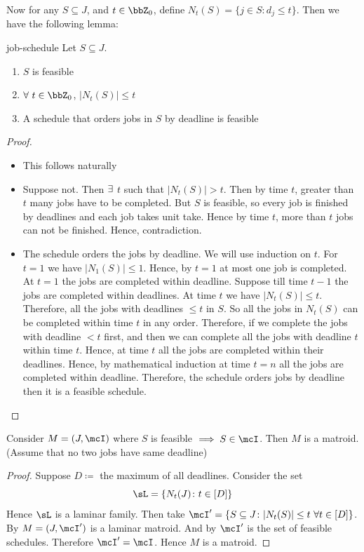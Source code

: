 Now  for any $S\subseteq J$, and $t\in\bbZ_0$, define $N_t(S)=\{j\in S\colon d_j\leq t\}$. Then we have the following lemma:
\begin{lemma}{}{job-schedule}
	Let $S\subseteq J$. \Tfae
	\begin{enumerate}[label=\bfseries\tiny\protect\circled{\small\arabic*}]
		\item $S$ is feasible
		\item $\forall\ t\in\bbZ_0$, $|N_t(S)|\leq t$
		\item A schedule that orders jobs in $S$ by deadline is feasible
	\end{enumerate}
\end{lemma}
\begin{proof}

\begin{itemize}[wide]
	\item[$3\implies 1$:] This follows naturally
	\item[$1\implies 2$:] Suppose not. Then $\exists$ $t$ such that $|N_t(S)|>t$. Then by time $t$, greater than $t$ many jobs have to be completed. But  $S$ is feasible, so every job is finished by deadlines and each job takes unit take. Hence by time $t$, more than $t$ jobs can not be finished. Hence, contradiction.
	\item[$2\implies 3$:] The schedule orders the jobs by deadline. We will use induction on $t$. For $t=1$ we have $|N_1(S)|\leq 1$. Hence, by $t=1$ at most one job is completed. At $t=1$ the jobs are completed within deadline. Suppose till time $t-1$ the jobs are completed within deadlines. At time $t$ we have $|N_t(S)|\leq t$. Therefore, all the jobs with deadlines $\leq t$ in $S$. So all the jobs in $N_t(S)$ can be completed within time $t$ in any order. Therefore, if we complete the jobs with deadline $<t$ first, and then we can complete all the jobs with deadline $t$ within time $t$. Hence, at time $t$ all the jobs are completed within their deadlines. Hence, by mathematical induction at time $t=n$ all the jobs are completed within deadline. Therefore, the schedule orders jobs by deadline then it is a feasible schedule.
\end{itemize}
\end{proof}
\begin{lemma}{}{}
	Consider $M=(J,\mcI)$ where $S$ is feasible $\implies S\in \mcI$. Then $M$ is a matroid. (Assume that no two jobs have same deadline)
\end{lemma}
\begin{proof}
	Suppose $D\coloneqq $ the maximum of all deadlines. Consider the set $$\sL=\{N_t(J)\colon t\in [D]\}$$Hence $\sL$ is a laminar family. Then take $\mcI'=\{S\subseteq J\colon |N_t(S)|\leq t\ \forall t\in [D]\}$. By  $M=(J,\mcI')$ is a laminar matroid. And by  $\mcI'$ is the set of feasible schedules. Therefore $\mcI'=\mcI$. Hence $M$ is a matroid.
\end{proof}
